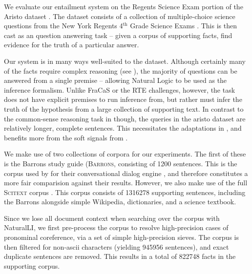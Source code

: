 

We evaluate our entailment system on the Regents Science Exam portion of
  the Aristo dataset \cite{key:2013clark-aristo,key:2015clark-aristo}.
The dataset consists of a collection of multiple-choice science questions
  from the New York Regents 4$^{\textrm{th}}$ Grade Science Exams
  \cite{key:NYSED}.
This is then cast as an question answering task -- given a corpus of
  supporting facts, find evidence for the truth of a particular answer.

Our system is in many ways well-suited to the dataset.
Although certainly many of the facts require complex reasoning
  (see ), the majority of questions can be
  answered from a single premise -- allowing Natural Logic to be used
  as the inference formalism.
Unlike FraCaS or the RTE challenges, however, the task does not have explicit
  premises to run inference from, but rather must infer the truth of the
  hypothesis from a large collection of supporting text.
In contrast to the common-sense reasoning task in 
  though, the queries in the aristo dataset are relatively longer, complete sentences.
This necessitates the adaptations in , and benefits more from the
  soft signals from .

We make use of two collections of corpora for our experiments.
The first of these is the Barrons study guide (\textsc{Barrons}, 
  consisting of \num{1200} sentences.
This is the corpus used by  for their conversational
  dialog engine \knowbot, and therefore constitutes a more fair comparision against 
  their results.
However, we also make use of the full \textsc{Scitext} corpus \cite{key:2014clark-aristo}.
This corpus consists of \num{1316278} supporting sentences, 
  including the Barrons alongside simple Wikipedia, dictionaries, and a science
  textbook.

Since we lose all document context when searching over the corpus with NaturalLI,
  we first pre-process the corpus to resolve high-precision cases of
  pronominal coreference, via a set of simple high-precision sieves.
The corpus is then filtered for non-ascii characters (yielding \num{945956} sentences),
  and exact duplicate sentences are removed.
This results in a total of \num{822748} facts in the supporting corpus.

